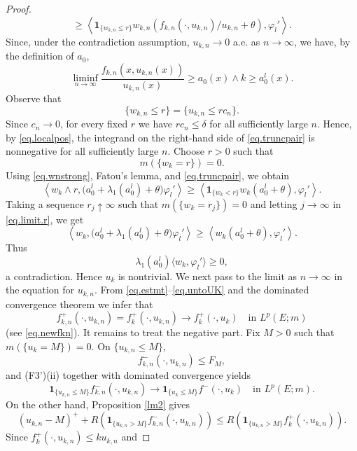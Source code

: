 \documentclass[10pt,a4paper]{amsart}
\begin{document}
\begin{proof}
\begin{equation}
\ge\left\langle\mathbf1_{\{w_{k,n}\le r\}}w_{k,n}\left(f_{k,n}(\cdot,u_{k,n})/u_{k,n}+\theta\right),\varphi_l'\right\rangle.
\end{equation}
Since, under the contradiction assumption, $u_{k,n}\to0$ a.e. as $n\to \infty$, we have,  by the definition of $a_0$,
\[
\liminf_{n\to\infty}
\frac{f_{k,n}(x,u_{k,n}(x))}{u_{k,n}(x)}
\ge
a_0(x)\wedge k
\ge a_0^l(x).
\]
Observe that
\[
\{w_{k,n}\le r\}
=
\{u_{k,n}\le r c_n\}.
\]
Since $c_n\to0$, for every fixed $r$ we have
$r c_n\le\delta$ for all sufficiently large $n$. Hence, by
\eqref{eq.localpos}, the integrand on the right-hand side of
\eqref{eq.truncpair} is nonnegative for all sufficiently large $n$.
Choose $r>0$ such that
\[
m(\{w_k=r\})=0.
\]
Using \eqref{eq.wnstrong}, Fatou's lemma, and
\eqref{eq.truncpair}, we obtain
\begin{equation}
\label{eq.limit.r}
\left\langle
w_k\wedge r,
\bigl(a_0^l+\lambda_1(a_0^l)+\theta\bigr)\varphi_l'
\right\rangle\ge\left\langle\mathbf1_{\{w_k<r\}}w_k(a_0^l+\theta),\varphi_l'\right\rangle.
\end{equation}
Taking a sequence $r_j\uparrow\infty$ such that
$m(\{w_k=r_j\})=0$ and letting $j\to\infty$ in
\eqref{eq.limit.r}, we get
\[
\left\langle
w_k,
\bigl(a_0^l+\lambda_1(a_0^l)+\theta\bigr)\varphi_l'
\right\rangle
\ge
\left\langle
w_k(a_0^l+\theta),
\varphi_l'
\right\rangle .
\]
Thus
\[
\lambda_1(a_0^l)
\langle w_k,\varphi_l'\rangle
\ge0,
\]
a contradiction.
Hence $u_k$ is nontrivial.  
We next pass to the limit as $n\to\infty$ in the equation for
$u_{k,n}$. From \eqref{eq.estmt}--\eqref{eq.untoUK}
and the dominated convergence theorem we infer that
\begin{equation}
\label{eq.posnlim}
f_{k,n}^+(\cdot,u_{k,n})=f_k^+(\cdot,u_{k,n})
\longrightarrow
f_k^+(\cdot,u_k)
\quad\text{in }L^p(E;m)
\end{equation}
(see \eqref{eq.newfkn}). It remains to treat the negative part. Fix $M>0$ such that $m(\{u_k=M\})=0$. On
$\{u_{k,n}\le M\}$,
\[
f_{k,n}^-(\cdot,u_{k,n})
\le
F_M,
\]
and \textup{(F3')(ii)} together with dominated convergence yields
\begin{equation}
\label{eq.localq}
\mathbf1_{\{u_{k,n}\le M\}}f_{k,n}^-(\cdot,u_{k,n})
\longrightarrow
\mathbf1_{\{u_k\le M\}}f^-(\cdot,u_k)
\quad\text{in }L^p(E;m).
\end{equation}
On the other hand, Proposition \ref{lm2} gives
\[
(u_{k,n}-M)^+
+
R\left(
\mathbf1_{\{u_{k,n}>M\}}f_{k,n}^-(\cdot,u_{k,n})
\right)
\le
R\left(
\mathbf1_{\{u_{k,n}>M\}}
f_k^+(\cdot,u_{k,n})
\right).
\]
Since $f_k^+(\cdot,u_{k,n})\le k u_{k,n}$ and

\end{proof}
\end{document}
